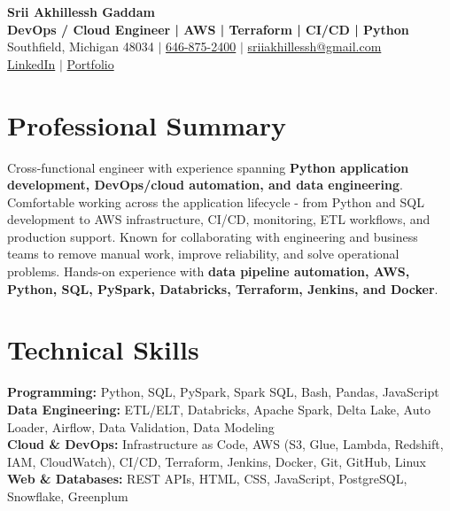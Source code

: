\documentclass[letterpaper,10pt]{article}
\begin{document}
\fontsize{9.35pt}{10.45pt}\selectfont

\begin{center}
    {\LARGE \textbf{Srii Akhillessh Gaddam}} \\[-1pt]
    \textbf{DevOps / Cloud Engineer | AWS | Terraform | CI/CD | Python} \\[2pt]
    Southfield, Michigan 48034 $|$
    \href{tel:6468752400}{646-875-2400} $|$
    \href{mailto:sriiakhillessh@gmail.com}{sriiakhillessh@gmail.com} \\[1pt]
    \href{https://www.linkedin.com/in/srii-akhiilessh-gaddam-b48668191/}{LinkedIn} $|$
    \href{https://sriiakhillesshg.github.io/portfolio/}{Portfolio}
\end{center}
\vspace{-8pt}

\section{Professional Summary}
\small{Cross-functional engineer with experience spanning \textbf{Python application development, DevOps/cloud automation, and data engineering}. Comfortable working across the application lifecycle - from Python and SQL development to AWS infrastructure, CI/CD, monitoring, ETL workflows, and production support. Known for collaborating with engineering and business teams to remove manual work, improve reliability, and solve operational problems. Hands-on experience with \textbf{data pipeline automation, AWS, Python, SQL, PySpark, Databricks, Terraform, Jenkins, and Docker}.}

\section{Technical Skills}
\small{
\textbf{Programming:} Python, SQL, PySpark, Spark SQL, Bash, Pandas, JavaScript \\
\textbf{Data Engineering:} ETL/ELT, Databricks, Apache Spark, Delta Lake, Auto Loader, Airflow, Data Validation, Data Modeling \\
\textbf{Cloud \& DevOps:} Infrastructure as Code, AWS (S3, Glue, Lambda, Redshift, IAM, CloudWatch), CI/CD, Terraform, Jenkins, Docker, Git, GitHub, Linux \\
\textbf{Web \& Databases:} REST APIs, HTML, CSS, JavaScript, PostgreSQL, Snowflake, Greenplum
}
\end{document}
